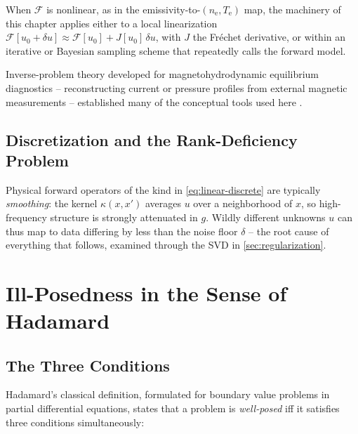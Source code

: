 When $\mathcal{F}$ is nonlinear, as in the emissivity-to-$(n_{\mathrm{e}},T_{\mathrm{e}})$ map, the machinery of this chapter applies either to a local linearization $\mathcal{F}[u_0 + \delta u] \approx \mathcal{F}[u_0] + J[u_0]\,\delta u$, with $J$ the Fréchet derivative, or within an iterative or Bayesian sampling scheme that repeatedly calls the forward model.

Inverse-problem theory developed for magnetohydrodynamic equilibrium diagnostics -- reconstructing current or pressure profiles from external magnetic measurements -- established many of the conceptual tools used here \cite{ref0687}.

\subsection{Discretization and the Rank-Deficiency Problem}

Physical forward operators of the kind in \cref{eq:linear-discrete} are typically \emph{smoothing}: the kernel $\kappa(x,x')$ averages $u$ over a neighborhood of $x$, so high-frequency structure is strongly attenuated in $g$. Wildly different unknowns $u$ can thus map to data differing by less than the noise floor $\delta$ -- the root cause of everything that follows, examined through the SVD in \cref{sec:regularization}.

\section{Ill-Posedness in the Sense of Hadamard}
\label{sec:hadamard}

\subsection{The Three Conditions}

Hadamard's classical definition, formulated for boundary value problems in partial differential equations, states that a problem is \emph{well-posed} iff it satisfies three conditions simultaneously:

